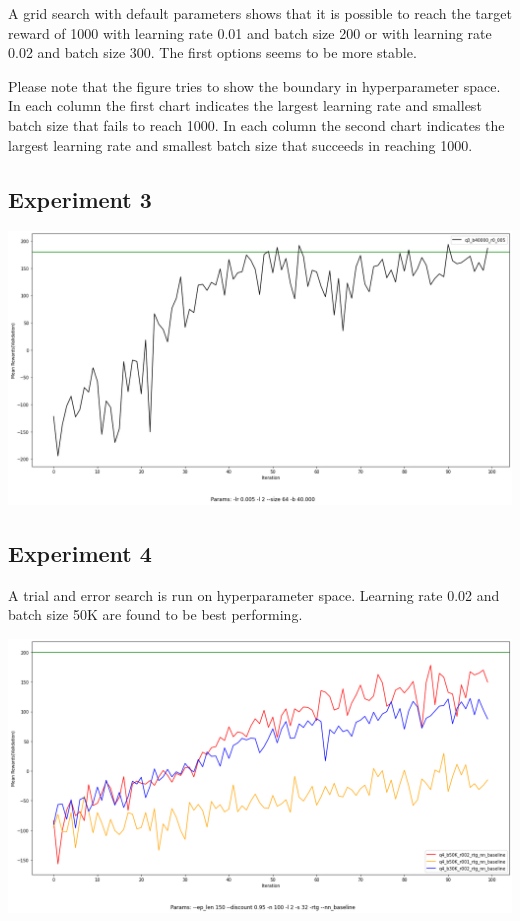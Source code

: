 \documentclass[11pt]{article}
\begin{document}
    A grid search with default parameters shows that it is possible to reach the target reward of 1000 with learning rate 0.01 and batch size 200 or with learning rate 0.02 and batch size 300.
    The first options seems to be more stable.

    Please note that the figure tries to show the boundary in hyperparameter space.
    In each column the first chart indicates the largest learning rate and smallest batch size that fails to reach 1000.
    In each column the second chart indicates the largest learning rate and smallest batch size that succeeds in reaching 1000.

    \subsection{Experiment 3}

    \hspace*{-0.5in}
    \includegraphics[scale=0.35]{q3/q3_b40000_r0.005_mean_rewards}

    \subsection{Experiment 4}

    A trial and error search is run on hyperparameter space.
    Learning rate 0.02 and batch size 50K are found to be best performing.

    \hspace*{-0.75in}
    \includegraphics[scale=0.35]{q4/q4_parameter_comparison}
\end{document}
